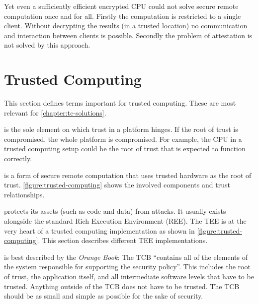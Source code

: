 Yet even a sufficiently efficient encrypted CPU could not solve secure remote computation once and for all. Firstly the computation is restricted to a single client. Without decrypting the results (in a trusted location) no communication and interaction between clients is possible. Secondly the problem of attestation is not solved by this approach.\label{ID_295590508}

\section{Trusted Computing\label{ID_360935729}\label{section:tc}}
This section defines terms important for trusted computing. These are most relevant for \autoref{chapter:tc-solutions}.\label{ID_1527667001}
\begin{description}\label{ID_1233402803}
\item[Root of trust]\label{ID_854088737}
is the sole element on which trust in a platform hinges. If the root of trust is compromised, the whole platform is compromised.\cite[]{Mitchell2005}\label{ID_1888900657}
For example, the CPU in a trusted computing setup could be the root of trust that is expected to function correctly.\label{ID_871944257}
\item[Trusted computing]\label{ID_1657615964}
is a form of secure remote computation that uses trusted hardware as the root of trust.\cite[]{Mitchell2005}\label{ID_1723503487}
\autoref{figure:trusted-computing} shows the involved components and trust relationships.\label{ID_535952528}
\item[Trusted Execution Environment (TEE)]\label{ID_261824335}
protects its assets (such as code and data) from attacks. It usually exists alongside the standard Rich Execution Environment (REE).\cite[]{GlobalPlatform}\label{ID_1872162923}
The TEE is at the very heart of a trusted computing implementation as shown in \autoref{figure:trusted-computing}. This section describes different TEE implementations.\label{ID_530801514}
\item[Trusted computing base (TCB)]\label{ID_1719015402}
is best described by the \textit{Orange Book}: The TCB ``contains all of the elements of the system responsible for supporting the security policy''.\cite[]{orangebook}\label{ID_1237482443}
This includes the root of trust, the application itself, and all intermediate software levels that have to be trusted.\label{ID_143606732}
Anything outside of the TCB does not have to be trusted.\label{ID_1731344432}
The TCB should be as small and simple as possible for the sake of security.\cite[]{orangebook}\label{ID_294862822}

\end{description}
